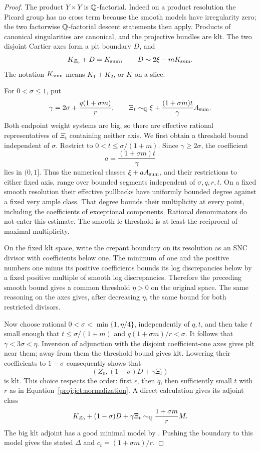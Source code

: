 \begin{proof}
The product \(Y\times Y\) is \(\mathbb{Q}\)-factorial.  Indeed on a product
resolution the Picard group has no cross term because the smooth
models have irregularity zero; the two factorwise
\(\mathbb{Q}\)-factorial descent statements then apply.  Products of
canonical singularities are canonical, and the projective bundles
are klt.  The two disjoint Cartier axes form a plt boundary \(D\),
and
\[
 K_{Z_0}+D=K_{\rm sum},\qquad
 D\sim2\xi-mK_{\rm sum}.
\]
The notation \(K_{\rm sum}\) means \(K_1+K_2\), or \(K\) on a slice.

For \(0<\sigma\le1\), put
\[
 \gamma=2\sigma+\frac{q(1+\sigma m)}r,\qquad
 \Xi_t\sim_{\mathbb{Q}}\xi+
       \frac{(1+\sigma m)t}{\gamma}A_{\rm sum}.
\]
Both endpoint weight systems are big, so there are effective
rational representatives of \(\Xi_t\) containing neither axis.
We first obtain a threshold bound independent of \(\sigma\).
Restrict to \(0<t\le\sigma/(1+m)\).  Since \(\gamma\ge2\sigma\),
the coefficient
\[
 a=\frac{(1+\sigma m)t}{\gamma}
\]
lies in \((0,1]\).  Thus the numerical classes
\(\xi+aA_{\rm sum}\), and their restrictions to either fixed axis,
range over bounded segments independent of \(\sigma,q,r,t\).
On a fixed smooth resolution their effective pullbacks have
uniformly bounded degree against a fixed very ample class.
That degree bounds their multiplicity at every point, including
the coefficients of exceptional components.  Rational denominators
do not enter this estimate.  The smooth lc threshold is at least
the reciprocal of maximal multiplicity.

On the fixed klt space, write the crepant boundary on its resolution
as an SNC divisor with coefficients below one.  The minimum of
one and the positive numbers one minus its positive coefficients
bounds its log discrepancies below by a fixed positive multiple
of smooth log discrepancies.  Therefore the preceding smooth
bound gives a common threshold \(\eta>0\) on the original space.
The same reasoning on the axes gives, after decreasing \(\eta\),
the same bound for both restricted divisors.

Now choose rational \(0<\sigma<\min\{1,\eta/4\}\), independently of
\(q,t\), and then take \(t\) small enough that
\(t\le\sigma/(1+m)\) and \(q(1+\sigma m)/r<\sigma\).
It follows that \(\gamma<3\sigma<\eta\).
Inversion of adjunction with the disjoint coefficient-one axes
gives plt near them; away from them the threshold bound gives klt.
Lowering their coefficients to \(1-\sigma\) consequently shows that
\[
 (Z_0,(1-\sigma)D+\gamma\Xi_t)
\]
is klt.  This choice respects the order: first \(\epsilon\), then
\(q\), then sufficiently small \(t\) with \(r\) as in
Equation~\eqref{proj:jet:normalization}.
A direct calculation gives its adjoint class
\[
 K_{Z_0}+(1-\sigma)D+\gamma\Xi_t
   \sim_{\mathbb{Q}}\frac{1+\sigma m}{r}M.
\]
The big klt adjoint has a good minimal model by
\cite{BCHM}.  Pushing the boundary to this model gives the stated
\(\Delta\) and \(c_t=(1+\sigma m)/r\).


\end{proof}
